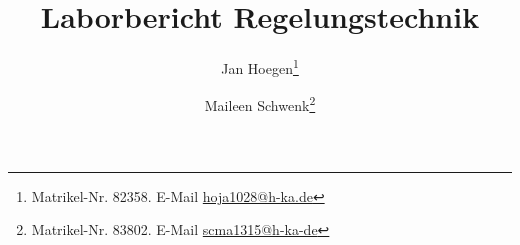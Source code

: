 

\hypersetup{
    colorlinks=true,
    bookmarksnumbered=true,
}


\flushbottom                                        %



        
\newcommand{\missing}{%
    \textcolor{coloryellow}{MISSING}%
    \PackageWarning{rtl_labor}{You used the 'missing' macro at this line. Remove it before finalising document}%
}
\newcommand{\improve}{%
    \textcolor{coloryellow}{IMPROVE}%
    \PackageWarning{rtl_labor}{You used the 'improve' macro at this line. Remove it before finalising document}%
}

\newcommand{\legend}[1]{\par\footnotesize\textbf{Legende}: #1\par}
\newcommand{\figsource}[1]{\par\footnotesize\textbf{Quelle:} #1\par}


\titlehead{%
    Hochschule Karlsruhe\\
    University of Applied Sciences\\
    Fakultät für Elektro- und Informationstechnik
}
\title{Laborbericht Regelungstechnik}


\author{%
    Jan Hoegen\thanks{%
        Matrikel-Nr. 82358. E-Mail \href{mailto:hoja1028@h-ka.de}{hoja1028@h-ka.de}}%
    \and%
    Maileen Schwenk\thanks{%
        Matrikel-Nr. 83802. E-Mail \href{mailto:scma1315@h-ka-de}{scma1315@h-ka-de}}
}

